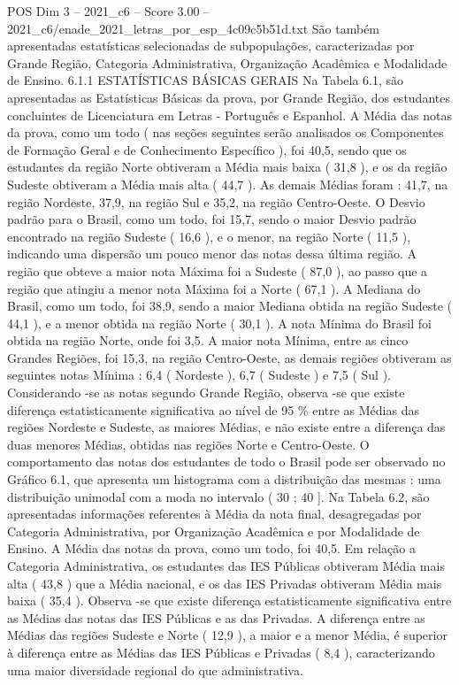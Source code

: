 \begin{textsample}{POS Dim 3 – 2021\_c6 – Score 3.00 – 2021\_c6/enade\_2021\_letras\_por\_esp\_4c09c5b51d.txt}
São também apresentadas estatísticas selecionadas de subpopulações, caracterizadas por Grande Região, Categoria Administrativa, Organização Acadêmica e Modalidade de Ensino. 6.1.1 ESTATÍSTICAS BÁSICAS GERAIS Na Tabela 6.1, são apresentadas as Estatísticas Básicas da prova, por Grande Região, dos estudantes concluintes de Licenciatura em Letras - Português e Espanhol.
A Média das notas da prova, como um todo ( nas seções seguintes serão analisados os Componentes de Formação Geral e de Conhecimento Específico ), foi 40,5, sendo que os estudantes da região Norte obtiveram a Média mais baixa ( 31,8 ), e os da região Sudeste obtiveram a Média mais alta ( 44,7 ).
As demais Médias foram : 41,7, na região Nordeste, 37,9, na região Sul e 35,2, na região Centro-Oeste.
O Desvio padrão para o Brasil, como um todo, foi 15,7, sendo o maior Desvio padrão encontrado na região Sudeste ( 16,6 ), e o menor, na região Norte ( 11,5 ), indicando uma dispersão um pouco menor das notas dessa última região.
A região que obteve a maior nota Máxima foi a Sudeste ( 87,0 ), ao passo que a região que atingiu a menor nota Máxima foi a Norte ( 67,1 ).
A Mediana do Brasil, como um todo, foi 38,9, sendo a maior Mediana obtida na região Sudeste ( 44,1 ), e a menor obtida na região Norte ( 30,1 ).
A nota Mínima do Brasil foi obtida na região Norte, onde foi 3,5.
A maior nota Mínima, entre as cinco Grandes Regiões, foi 15,3, na região Centro-Oeste, as demais regiões obtiveram as seguintes notas Mínima : 6,4 ( Nordeste ), 6,7 ( Sudeste ) e 7,5 ( Sul ).
Considerando -se as notas segundo Grande Região, observa -se que existe diferença estatisticamente significativa ao nível de 95 \% entre as Médias das regiões Nordeste e Sudeste, as maiores Médias, e não existe entre a diferença das duas menores Médias, obtidas nas regiões Norte e Centro-Oeste.
O comportamento das notas dos estudantes de todo o Brasil pode ser observado no Gráfico 6.1, que apresenta um histograma com a distribuição das mesmas : uma distribuição unimodal com a moda no intervalo ( 30 ; 40 ].
Na Tabela 6.2, são apresentadas informações referentes à Média da nota final, desagregadas por Categoria Administrativa, por Organização Acadêmica e por Modalidade de Ensino.
A Média das notas da prova, como um todo, foi 40,5.
Em relação a Categoria Administrativa, os estudantes das IES Públicas obtiveram Média mais alta ( 43,8 ) que a Média nacional, e os das IES Privadas obtiveram Média mais baixa ( 35,4 ).
Observa -se que existe diferença estatisticamente significativa entre as Médias das notas das IES Públicas e as das Privadas.
A diferença entre as Médias das regiões Sudeste e Norte ( 12,9 ), a maior e a menor Média, é superior à diferença entre as Médias das IES Públicas e Privadas ( 8,4 ), caracterizando uma maior diversidade regional do que administrativa.

\end{textsample}
